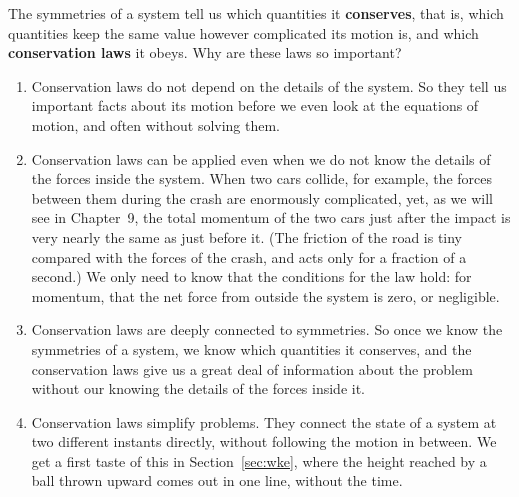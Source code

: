 \documentclass[11pt,a4paper]{article}
\begin{document}
The symmetries of a system tell us which quantities it \textbf{conserves}, that is, which quantities
keep the same value however complicated its motion is, and which \textbf{conservation laws} it
obeys. Why are these laws so important?
\begin{enumerate}
  \item Conservation laws do not depend on the details of the system. So they tell us important
    facts about its motion before we even look at the equations of motion, and often without
    solving them.
  \item Conservation laws can be applied even when we do not know the details of the forces inside
    the system. When two cars collide, for example, the forces between them during the crash are
    enormously complicated, yet, as we will see in Chapter~9, the total momentum of the two cars
    just after the impact is very nearly the same as just before it. (The friction of the road is
    tiny compared with the forces of the crash, and acts only for a fraction of a second.) We only
    need to know that the conditions for the law hold: for momentum, that the net force from
    outside the system is zero, or negligible.
  \item Conservation laws are deeply connected to symmetries. So once we know the symmetries of a
    system, we know which quantities it conserves, and the conservation laws give us a great deal of
    information about the problem without our knowing the details of the forces inside it.
  \item Conservation laws simplify problems. They connect the state of a system at two different
    instants directly, without following the motion in between. We get a first taste of this in
    Section~\ref{sec:wke}, where the height reached by a ball thrown upward comes out in one line,
    without the time.
\end{enumerate}
\end{document}
